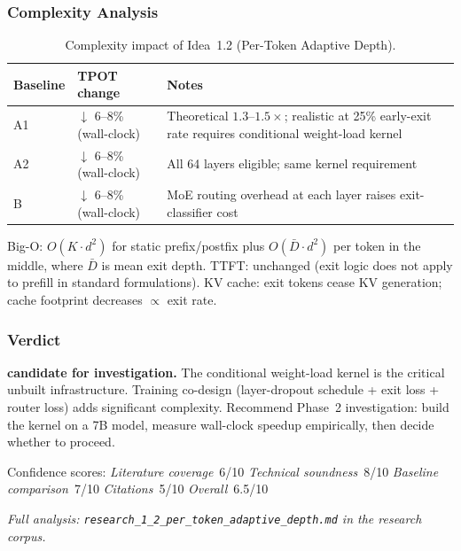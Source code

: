 \documentclass[11pt]{article}
\begin{document}
\subsubsection*{Complexity Analysis}

\begin{table}[h]
\centering
\caption{Complexity impact of Idea~1.2 (Per-Token Adaptive Depth).}
\label{tab:complexity-1-2}
\begin{tabular}{llp{7cm}}
\toprule
\textbf{Baseline} & \textbf{TPOT change} & \textbf{Notes} \\
\midrule
A1 & $\downarrow$ 6--8\% (wall-clock)  & Theoretical $1.3$--$1.5\times$; realistic at 25\% early-exit rate requires conditional weight-load kernel \\
A2 & $\downarrow$ 6--8\% (wall-clock)  & All 64 layers eligible; same kernel requirement \\
B  & $\downarrow$ 6--8\% (wall-clock)  & MoE routing overhead at each layer raises exit-classifier cost \\
\bottomrule
\end{tabular}
\end{table}

\noindent
Big-O: $O(K \cdot d^2)$ for static prefix/postfix plus $O(\bar{D} \cdot d^2)$ per token in the middle, where $\bar{D}$ is mean exit depth.
TTFT: unchanged (exit logic does not apply to prefill in standard formulations).
KV cache: exit tokens cease KV generation; cache footprint decreases $\propto$ exit rate.

\subsubsection*{Verdict}
\textbf{candidate for investigation.}
The conditional weight-load kernel is the critical unbuilt infrastructure.
Training co-design (layer-dropout schedule + exit loss + router loss) adds significant complexity.
Recommend Phase~2 investigation: build the kernel on a 7B model, measure wall-clock speedup empirically, then decide whether to proceed.

\noindent
Confidence scores:
\emph{Literature coverage}~6/10 \quad
\emph{Technical soundness}~8/10 \quad
\emph{Baseline comparison}~7/10 \quad
\emph{Citations}~5/10 \quad
\emph{Overall}~6.5/10
\par\noindent\textit{Full analysis: \texttt{research\_1\_2\_per\_token\_adaptive\_depth.md} in the research corpus.}


\end{document}
